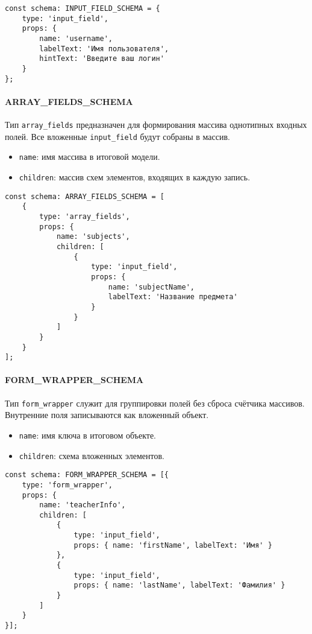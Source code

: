 \begin{lstlisting}[caption={Пример INPUT\_FIELD\_SCHEMA}]
const schema: INPUT_FIELD_SCHEMA = {
	type: 'input_field',
	props: {
		name: 'username',
		labelText: 'Имя пользователя',
		hintText: 'Введите ваш логин'
	}
};
\end{lstlisting}

\paragraph{ARRAY\_FIELDS\_SCHEMA}
Тип \texttt{array\_fields} предназначен для формирования массива однотипных входных полей. Все вложенные \texttt{input\_field} будут собраны в массив.
\begin{itemize}
	\item \texttt{name}: имя массива в итоговой модели.
	\item \texttt{children}: массив схем элементов, входящих в каждую запись.
\end{itemize}

\begin{lstlisting}[caption={Пример ARRAY\_FIELDS\_SCHEMA}]
const schema: ARRAY_FIELDS_SCHEMA = [
	{
		type: 'array_fields',
		props: {
			name: 'subjects',
			children: [
				{
					type: 'input_field',
					props: {
						name: 'subjectName',
						labelText: 'Название предмета'
					}
				}
			]
		}
	}
];
\end{lstlisting}

\paragraph{FORM\_WRAPPER\_SCHEMA}
Тип \texttt{form\_wrapper} служит для группировки полей без сброса счётчика массивов. Внутренние поля записываются как вложенный объект.
\begin{itemize}
	\item \texttt{name}: имя ключа в итоговом объекте.
	\item \texttt{children}: схема вложенных элементов.
\end{itemize}

\begin{lstlisting}[caption={Пример FORM\_WRAPPER\_SCHEMA}]
const schema: FORM_WRAPPER_SCHEMA = [{
	type: 'form_wrapper',
	props: {
		name: 'teacherInfo',
		children: [
			{
				type: 'input_field',
				props: { name: 'firstName', labelText: 'Имя' }
			},
			{
				type: 'input_field',
				props: { name: 'lastName', labelText: 'Фамилия' }
			}
		]
	}
}];
\end{lstlisting}

